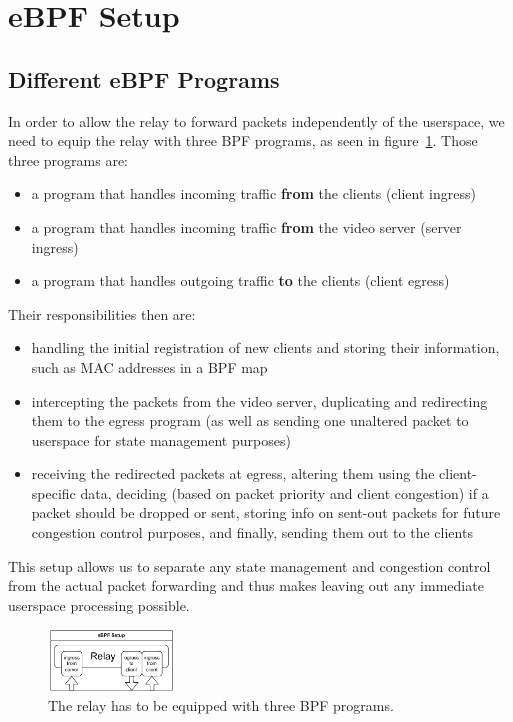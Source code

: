 \section{eBPF Setup}\label{sec:ebpf_setup}

\subsection{Different eBPF Programs}

In order to allow the relay to forward packets independently of the userspace, we
need to equip the relay with three BPF programs, as seen in figure~\ref{fig:ebpf-programs}.
Those three programs are:

\begin{itemize}
    \item a program that handles incoming traffic \textbf{from} the clients (client ingress)
    \item a program that handles incoming traffic \textbf{from} the video server (server ingress)
    \item a program that handles outgoing traffic \textbf{to} the clients (client egress)
\end{itemize}
Their responsibilities then are:

\begin{itemize}
    \item handling the initial registration of new clients and storing their information, such as
    MAC addresses in a BPF map
    \item intercepting the packets from the video server, duplicating and redirecting them to 
    the egress program (as well as sending one unaltered packet to userspace for state
    management purposes)
    \item receiving the redirected packets at egress, altering them using the client-specific
    data, deciding (based on packet priority and client congestion) if a packet should be dropped 
    or sent, storing info on sent-out packets for future congestion control purposes, and finally, sending 
    them out to the clients
\end{itemize}
This setup allows us to separate any state management and congestion control from the actual
packet forwarding and thus makes leaving out any immediate userspace processing possible.

\vspace{0.5cm}
\begin{figure}[H]
    \centering
    \includegraphics[width=0.3\textwidth]{figures/03_fast_relays/ebpf-setup.drawio.pdf}
    \caption[Types of eBPF programs at relay]{The relay has to be equipped with three BPF programs.}\label{fig:ebpf-programs}
\end{figure}

